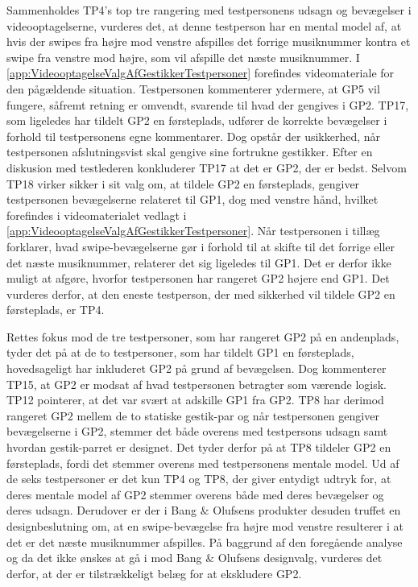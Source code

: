 \noindent
%
Sammenholdes TP4's top tre rangering med testpersonens udsagn og bevægelser i videooptagelserne, vurderes det, at denne testperson har en mental model af, at hvis der swipes fra højre mod venstre afspilles det forrige musiknummer kontra et swipe fra venstre mod højre, som vil afspille det næste musiknummer. I \autoref{app:VideooptagelseValgAfGestikkerTestpersoner} forefindes videomateriale for den pågældende situation. Testpersonen kommenterer ydermere, at GP5 vil fungere, såfremt retning er omvendt, svarende til hvad der gengives i GP2. TP17, som ligeledes har tildelt GP2 en førsteplads, udfører de korrekte bevægelser i forhold til testpersonens egne kommentarer. Dog opstår der usikkerhed, når testpersonen afslutningsvist skal gengive sine fortrukne gestikker. Efter en diskusion med testlederen konkluderer TP17 at det er GP2, der er bedst. Selvom TP18 virker sikker i sit valg om, at tildele GP2 en førsteplads, gengiver testpersonen bevægelserne relateret til GP1, dog med venstre hånd, hvilket forefindes i videomaterialet vedlagt i \autoref{app:VideooptagelseValgAfGestikkerTestpersoner}. Når testpersonen i tillæg forklarer, hvad swipe-bevægelserne gør i forhold til at skifte til det forrige eller det næste musiknummer, relaterer det sig ligeledes til GP1. Det er derfor ikke muligt at afgøre, hvorfor testpersonen har rangeret GP2 højere end GP1. Det vurderes derfor, at den eneste testperson, der med sikkerhed vil tildele GP2 en førsteplads, er TP4. 

Rettes fokus mod de tre testpersoner, som har rangeret GP2 på en andenplads, tyder det på at de to testpersoner, som har tildelt GP1 en førsteplads, hovedsageligt har inkluderet GP2 på grund af bevægelsen. Dog kommenterer TP15, at GP2 er modsat af hvad testpersonen betragter som værende logisk. TP12 pointerer, at det var svært at adskille GP1 fra GP2. TP8 har derimod rangeret GP2 mellem de to statiske gestik-par og når testpersonen gengiver bevægelserne i GP2, stemmer det både overens med testpersons udsagn samt hvordan gestik-parret er designet. Det tyder derfor på at TP8 tildeler GP2 en førsteplads, fordi det stemmer overens med testpersonens mentale model.\blankline 
%
Ud af de seks testpersoner er det kun TP4 og TP8, der giver entydigt udtryk for, at deres mentale model af GP2 stemmer overens både med deres bevægelser og deres udsagn. Derudover er der i Bang $\&$ Olufsens produkter desuden truffet en designbeslutning om, at en swipe-bevægelse fra højre mod venstre resulterer i at det er det næste musiknummer afspilles. På baggrund af den foregående analyse og da det ikke ønskes at gå i mod Bang $\&$ Olufsens designvalg, vurderes det derfor, at der er tilstrækkeligt belæg for at ekskludere GP2. 

